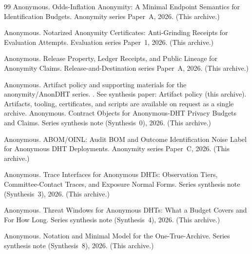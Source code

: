 \documentclass[11pt]{article}
\begin{document}
\begin{thebibliography}{99}
Anonymous.
\newblock Odds-Inflation Anonymity: A Minimal Endpoint Semantics for Identification Budgets.
\newblock Anonymity series Paper~A, 2026. (This archive.)

Anonymous.
\newblock Notarized Anonymity Certificates: Anti-Grinding Receipts for Evaluation Attempts.
\newblock Evaluation series Paper~1, 2026. (This archive.)

Anonymous.
\newblock Release Property, Ledger Receipts, and Public Lineage for Anonymity Claims.
\newblock Release-and-Destination series Paper~A, 2026. (This archive.)

Anonymous.
\newblock Artifact policy and supporting materials for the anonymity/AnonDHT series.
.
\newblock See synthesis paper: Artifact policy (this archive). Artifacts, tooling, certificates, and scripts are available on request as a single archive.
Anonymous.
\newblock Contract Objects for Anonymous-DHT Privacy Budgets and Claims.
\newblock Series synthesis note (Synthesis~0), 2026. (This archive.)

Anonymous.
\newblock ABOM/OINL: Audit BOM and Outcome Identification Noise Label for Anonymous DHT Deployments.
\newblock Anonymity series Paper~C, 2026. (This archive.)

Anonymous.
\newblock Trace Interfaces for Anonymous {DHT}s: Observation Tiers, Committee-Contact Traces, and Exposure Normal Forms.
\newblock Series synthesis note (Synthesis~3), 2026. (This archive.)

Anonymous.
\newblock Threat Windows for Anonymous {DHT}s: What a Budget Covers and For How Long.
\newblock Series synthesis note (Synthesis~4), 2026. (This archive.)


Anonymous.
\newblock Notation and Minimal Model for the One-True-Archive.
\newblock Series synthesis note (Synthesis~8), 2026. (This archive.)

\end{thebibliography}
\end{document}
